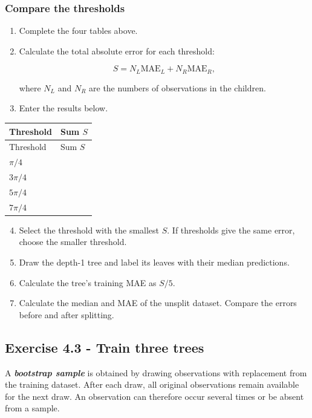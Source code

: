 \documentclass{course_sheet}
\begin{document}
\subsubsection*{Compare the thresholds}
\begin{enumerate}
\item
Complete the four tables above.

\item
Calculate the total absolute error for each threshold:

\[
S=N_L\mathrm{MAE}_L+N_R\mathrm{MAE}_R,
\]

where $N_L$ and $N_R$ are the numbers of observations in the children.

\item
Enter the results below.

\end{enumerate}
\begingroup
\small
\setlength{\tabcolsep}{4pt}
\begin{longtable}{l|l}
Threshold & Sum $S$ \\
\hline
\endfirsthead
Threshold & Sum $S$ \\
\hline
\endhead
$\pi/4$ & $\phantom{0}$ \\[3pt]
$3\pi/4$ & $\phantom{0}$ \\[3pt]
$5\pi/4$ & $\phantom{0}$ \\[3pt]
$7\pi/4$ & $\phantom{0}$ \\[3pt]
\end{longtable}
\endgroup
\begin{enumerate}
\setcounter{enumi}{3}
\item
Select the threshold with the smallest $S$. If thresholds give the same error, choose the smaller threshold.

\item
Draw the depth-1 tree and label its leaves with their median predictions.

\item
Calculate the tree's training MAE as $S/5$.

\item
Calculate the median and MAE of the unsplit dataset. Compare the errors before and after splitting.

\end{enumerate}
\subsection*{Exercise 4.3 - Train three trees}
A \textbf{\textit{bootstrap sample}} is obtained by drawing observations with replacement from the training dataset. After each draw, all original observations remain available for the next draw. An observation can therefore occur several times or be absent from a sample.
\end{document}
